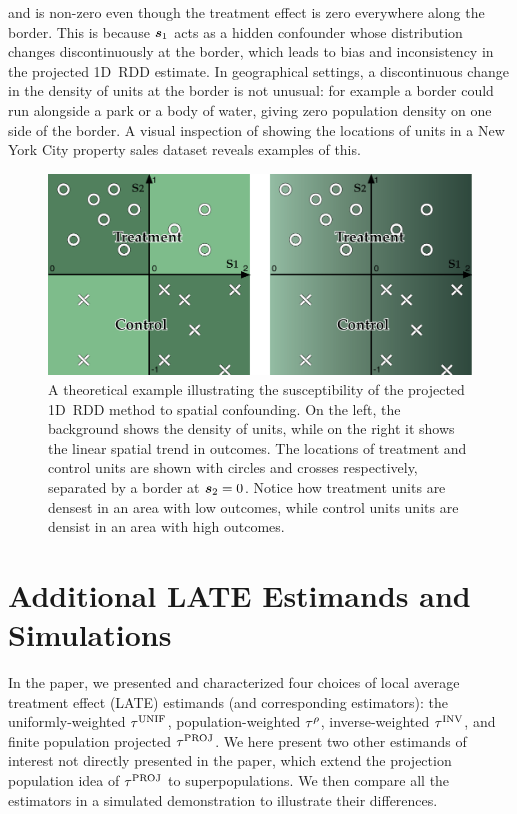 and is non-zero even though the treatment effect is zero everywhere along the border.
This is because \(\bm{s}_1\) acts as a hidden confounder whose distribution changes discontinuously at the border, which leads to bias and inconsistency in the projected 1D~RDD estimate.
In geographical settings, a discontinuous change in the density of units at the border is not unusual: for example a border could run alongside a park or a body of water, giving zero population density on one side of the border.
A visual inspection of  showing the locations of units in a New York City property sales dataset reveals examples of this.

\begin{figure}[tb]
    \centering
    \includegraphics[height=0.3\textheight]{figures/confounding/confounding.pdf}
    \caption{
        A theoretical example illustrating the susceptibility of the projected 1D~RDD method to spatial confounding. 
        On the left, the background shows the density of units, while on the right it shows the linear spatial trend in outcomes.
        The locations of treatment and control units are shown with circles and crosses respectively, separated by a border at \(\bm{s}_2 = 0\). 
        Notice how treatment units are densest in an area with low outcomes, while control units units are densist in an area with high outcomes.
        \label{fig:confounding}}
\end{figure}

\section{Additional LATE Estimands and Simulations}
\label{sec:additional_late}

	In the paper, we presented and characterized four choices of local average treatment effect (LATE) estimands (and corresponding estimators): the uniformly-weighted \(\tau^{\mathrm{UNIF}}\), population-weighted \(\tau^{\rho}\), inverse-weighted \(\tau^{\mathrm{INV}}\), and finite population projected \(\tau^{\mathrm{PROJ}}\).
We here present two other estimands of interest not directly presented in the paper, which extend the projection population idea of \(\tau^{\mathrm{PROJ}}\) to superpopulations.
We then compare all the estimators in a simulated demonstration to illustrate their differences.

